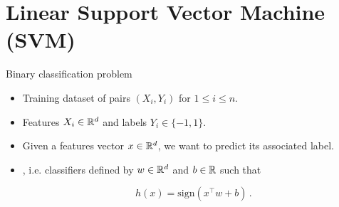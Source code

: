 \documentclass[xcolor={usenames,dvipsnames}]{beamer}
\begin{document}
%

%
%


\section{Linear Support Vector Machine (SVM)}


\begin{frame}{Binary classification problem}
 \begin{itemize}
    \item Training dataset of pairs $(X_i, Y_i)$ for $1\leq i \leq n$.

\vspace{.2cm}

    \item \alert{Features $X_i \in \mathbb{R}^d$} and \alert{labels $Y_i \in \{ -1, 1 \}$}.

\vspace{.2cm}

    \item Given a features vector $x \in \mathbb{R}^d$, we want to predict its associated label.

\vspace{.2cm}

\item {}, i.e. classifiers defined by $w\in\mathbb{R}^d$ and $b\in\mathbb{R}$ such that

$$
h(x) = \mathrm{sign}(x^\top w  + b)\,.
$$
  \end{itemize}
\end{frame}
\end{document}

